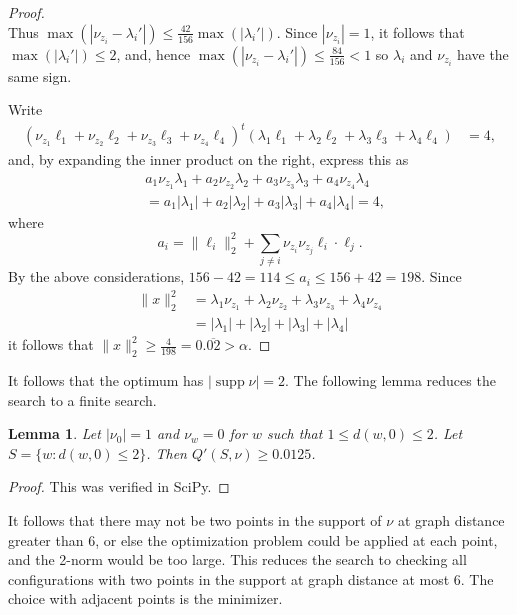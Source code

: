 \documentclass[a4paper, 12pt, notitlepage]{amsart}
\newcommand{\supp}{\operatorname{supp}}
\newtheorem{lemma}[theorem]{Lemma}
\theoremstyle{remark}
\begin{document}
\begin{proof}
\begin{equation}
\end{equation}
Thus $\max(|\nu_{z_i} - \lambda_i'|) \leq \frac{42}{156} \max (|\lambda_i'|)$.  Since $|\nu_{z_i}| = 1$, it follows that $\max(|\lambda_i'|) \leq 2$, and, hence $\max(|\nu_{z_i} - \lambda_i'|) \leq \frac{84}{156} < 1$ so $\lambda_i$ and $\nu_{z_i}$ have the same sign.

Write
\begin{align*}
 (\nu_{z_1}\ell_1 + \nu_{z_2} \ell_2 + \nu_{z_3} \ell_3 + \nu_{z_4}\ell_4)^t (\lambda_1 \ell_1 + \lambda_2 \ell_2 + \lambda_3 \ell_3 + \lambda_4 \ell_4) &= 4,
\end{align*}
and, by expanding the inner product on the right, express this as
\begin{align*}&a_1 \nu_{z_1} \lambda_1 + a_2 \nu_{z_2} \lambda_2 + a_3 \nu_{z_3} \lambda_3 + a_4 \nu_{z_4}\lambda_4\\
 &= a_1 |\lambda_1| + a_2 |\lambda_2| + a_3 |\lambda_3| + a_4 |\lambda_4| = 4,
\end{align*}
where 
\begin{equation*}
 a_i = \|\ell_i\|_2^2 + \sum_{j \neq i} \nu_{z_i}\nu_{z_j} \ell_i \cdot \ell_j.
\end{equation*}
 By the above considerations, $156 - 42 = 114 \leq a_i \leq 156 + 42 = 198$.
Since
\begin{align*}
 \|x\|_2^2 &= \lambda_1 \nu_{z_1} + \lambda_2 \nu_{z_2} + \lambda_3 \nu_{z_3} + \lambda_4 \nu_{z_4}\\
 &= |\lambda_1| + |\lambda_2| + |\lambda_3| + |\lambda_4|
\end{align*}
it follows that $\|x\|_2^2 \geq \frac{4}{198} = 0.\overline{02}>\alpha.$ 
\end{proof}

It follows that the optimum has $|\supp \nu| = 2$.  The following lemma reduces the search to a finite search.
\begin{lemma}
 Let $|\nu_0| = 1$ and $\nu_w = 0$ for $w$ such that $1\leq d(w,0)\leq 2$.  Let $S = \{w: d(w,0) \leq 2\}$.  Then $Q'(S, \nu) \geq 0.0125$. 
\end{lemma}
\begin{proof}
 This was verified in SciPy.
\end{proof}
 It follows that there may not be two points in the support of $\nu$ at graph distance greater than 6, or else the optimization problem could be applied at each point, and the 2-norm would be too large. This reduces the search to checking all configurations with two points in the support at graph distance at most 6.    The choice with adjacent points is the minimizer. 
\end{document}
